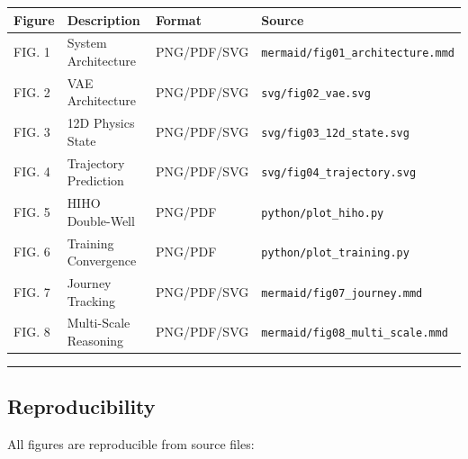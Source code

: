 \documentclass[
  letterpaper,
  DIV=11,
  numbers=noendperiod]{scrartcl}
\begin{document}
\begin{longtable}[]{@{}
  >{\raggedright\arraybackslash}p{}
  >{\raggedright\arraybackslash}p{}
  >{\raggedright\arraybackslash}p{}
  >{\raggedright\arraybackslash}p{}@{}}
\toprule\noalign{}
\begin{minipage}[b]{\linewidth}\raggedright
Figure
\end{minipage} & \begin{minipage}[b]{\linewidth}\raggedright
Description
\end{minipage} & \begin{minipage}[b]{\linewidth}\raggedright
Format
\end{minipage} & \begin{minipage}[b]{\linewidth}\raggedright
Source
\end{minipage} \\
\midrule\noalign{}
\endhead
\bottomrule\noalign{}
\endlastfoot
FIG. 1 & System Architecture & PNG/PDF/SVG &
\texttt{mermaid/fig01\_architecture.mmd} \\
FIG. 2 & VAE Architecture & PNG/PDF/SVG & \texttt{svg/fig02\_vae.svg} \\
FIG. 3 & 12D Physics State & PNG/PDF/SVG &
\texttt{svg/fig03\_12d\_state.svg} \\
FIG. 4 & Trajectory Prediction & PNG/PDF/SVG &
\texttt{svg/fig04\_trajectory.svg} \\
FIG. 5 & HIHO Double-Well & PNG/PDF & \texttt{python/plot\_hiho.py} \\
FIG. 6 & Training Convergence & PNG/PDF &
\texttt{python/plot\_training.py} \\
FIG. 7 & Journey Tracking & PNG/PDF/SVG &
\texttt{mermaid/fig07\_journey.mmd} \\
FIG. 8 & Multi-Scale Reasoning & PNG/PDF/SVG &
\texttt{mermaid/fig08\_multi\_scale.mmd} \\
\end{longtable}

\begin{center}\rule{0.5\linewidth}{0.5pt}\end{center}

\subsection{Reproducibility}\label{reproducibility}

All figures are reproducible from source files:
\end{document}
